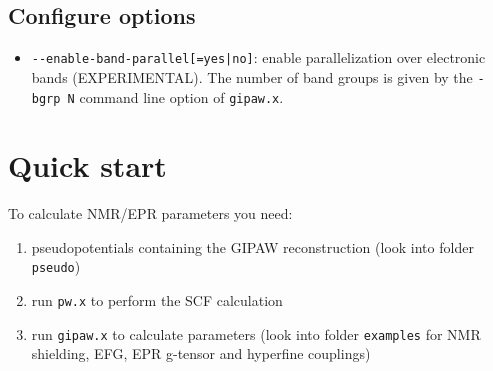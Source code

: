 \documentclass[a4paper,11pt,twoside]{article}
\begin{document}
\subsection{Configure options}
\begin{itemize}
  \item \verb+--enable-band-parallel[=yes|no]+: enable parallelization
  over electronic bands (EXPERIMENTAL). The number of band groups is
  given by the \texttt{-bgrp N} command line option of \texttt{gipaw.x}.
\end{itemize}


\section{Quick start}
To calculate NMR/EPR parameters you need: 
\begin{enumerate}
\item pseudopotentials containing the GIPAW reconstruction (look into
folder \texttt{pseudo})
\item run \texttt{pw.x} to perform the SCF calculation 
\item run \texttt{gipaw.x} to calculate parameters (look into folder
\texttt{examples} for NMR shielding, EFG, EPR g-tensor and hyperfine
couplings)
\end{enumerate}

\end{document}
